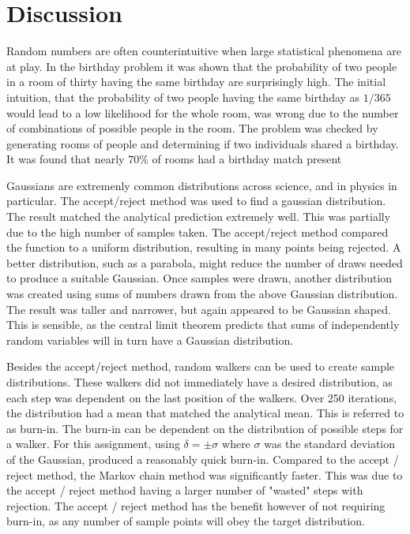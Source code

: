 \message{ !name(Assn1.tex)}\documentclass[twocolumn]{article}
\begin{document}
\section{Discussion}
Random numbers are often counterintuitive when large statistical phenomena are at play. In the birthday problem it was shown that the probability of two people in a room of thirty having the same birthday are surprisingly high. The initial intuition, that the probability of two people having the same birthday as $1/365$ would lead to a low likelihood for the whole room, was wrong due to the number of combinations of possible people in the room. The problem was checked by generating rooms of people and determining if two individuals shared a birthday. It was found that nearly $70\%$ of rooms had a birthday match present

Gaussians are extremenly common distributions across science, and in physics in particular. The accept/reject method was used to find a gaussian distribution. The result matched the analytical prediction extremely well. This was partially due to the high number of samples taken. The accept/reject method compared the function to a uniform distribution, resulting in many points being rejected. A better distribution, such as a parabola, might reduce the number of draws needed to produce a suitable Gaussian. Once samples were drawn, another distribution was created using sums of numbers drawn from the above Gaussian distribution. The result was taller and narrower, but again appeared to be Gaussian shaped. This is sensible, as the central limit theorem predicts that sums of independently random variables will in turn have a Gaussian distribution.


Besides the accept/reject method, random walkers can be used to create sample distributions. These walkers did not immediately have a desired distribution, as each step was dependent on the last position of the walkers. Over 250 iterations, the distribution had a mean that matched the analytical mean. This is referred to as burn-in. The burn-in can be dependent on the distribution of possible steps for a walker. For this assignment, using $\delta = \pm \sigma$ where $\sigma$ was the standard deviation of the Gaussian,  produced a reasonably quick burn-in. Compared to the accept / reject method, the Markov chain method was significantly faster. This was due to the accept / reject method having a larger number of "wasted" steps with rejection. The accept / reject method has the benefit however of not requiring burn-in, as any number of sample points will obey the target distribution.
\end{document}
